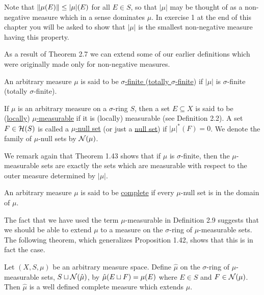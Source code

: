 Note that $\norm{\mu(E)}\leq|\mu|(E)$ for all $E \in S$, so that $|\mu|$ may be thought of as a non-negative measure which in a sense dominates $\mu$. In exercise 1 at the end of this chapter you will be asked to show that $|\mu|$ is the smallest non-negative measure having this property.

As a result of Theorem 2.7 we can extend some of our earlier definitions which were originally made only for non-negative measures.

\begin{definition}
An arbitrary measure $\mu$ is said to be \underline{$\sigma$-finite } (\underline{totally $\sigma$-finite}) if $|\mu|$ is $\sigma$-finite (totally $\sigma$-finite).
\end{definition}

\begin{definition}
If $\mu$ is an arbitrary measure on a $\sigma$-ring $S$, then a set $E \subseteq X$ is said to be (\underline{locally}) \underline{$\mu$-measurable} if it is (locally) measurable (see Definition 2.2). A set $F \in {\cal H}(S)$ is called a \underline{$\mu$-null set} (or just a \underline{null set}) if $|\mu|^*(F)=0$. We denote the family of $\mu$-null sets by ${\cal N}(\mu)$.
\end{definition}

We remark again that Theorem 1.43 shows that if $\mu$ is $\sigma$-finite, then the $\mu$-measurable sets are exactly the sets which are measurable with respect to the outer measure determined by $|\mu|$.

\begin{definition}
An arbitrary measure $\mu$ is said to be \underline{complete} if every $\mu$-null set is in the domain of $\mu$.
\end{definition}

The fact that we have used the term $\mu$-measurable in Definition 2.9 suggests that we should be able to extend $\mu$ to a measure on the $\sigma$-ring of $\mu$-measurable sets. The following theorem, which generalizes Proposition 1.42, shows that this is in fact the case.

\begin{theorem}
Let $(X, S, \mu)$ be an arbitrary measure space. Define $\hat{\mu}$ on the $\sigma$-ring of $\mu$-measurable sets, $S\sqcup{\cal N}(\hat{\mu})$, by $\hat{\mu}(E\sqcup F)=\mu(E)$ where $E\in S$ and ${F} \in {\cal N}(\mu)$. Then $\hat{\mu}$ is a well defined complete measure which extends $\mu$.
\end{theorem}

